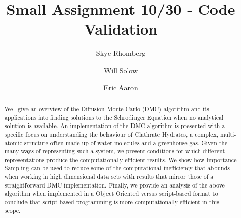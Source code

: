 \documentclass[journal=jacsat,manuscript=article]{achemso}
\author{Skye Rhomberg}
\author{Will Solow}
\author{Eric Aaron}
\affiliation[Colby College]
{Department of Computer Science, Colby College, Waterville, ME}
\title[An \textsf{achemso} demo]
  {Small Assignment 10/30 - Code Validation}
\begin{document}
%
%
%
%
%

\begin{abstract}
We~\cite{Anderson1975} give an overview of the Diffusion Monte Carlo (DMC) algorithm and its applications into finding solutions to the Schrodinger Equation when no analytical solution is available. An implementation of the DMC algorithm is presented with a specific focus on understanding the behaviour of Clathrate Hydrates, a complex, multi-atomic structure often made up of water molecules and a greenhouse gas. Given the many ways of representing such a system, we present conditions for which different representations produce the computationally efficient results. We show how Importance Sampling can be used to reduce some of the computational inefficiency that abounds when working in high dimensional data sets with results that mirror those of a straightforward DMC implementation. Finally, we provide an analysis of the above algorithm when implemented in a Object Oriented versus script-based format to conclude that script-based programming is more computationally efficient in this scope.
\end{abstract}
\end{document}
